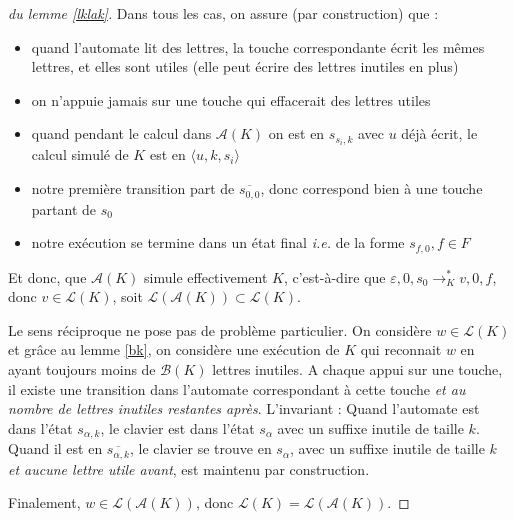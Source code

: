 \documentclass[12pt, a4paper]{article}
\renewcommand{\L}{\mathcal{L}}
\newcommand{\A}{\mathcal{A}}
\begin{document}
\begin{proof}[du lemme \ref{lklak}]
       Dans tous les cas, on assure (par construction) que :
       \begin{itemize}
        \item quand l'automate lit des lettres, la touche correspondante écrit les mêmes lettres, et elles sont utiles (elle peut écrire des lettres inutiles en plus)
        \item on n'appuie jamais sur une touche qui effacerait des lettres utiles 
        \item quand pendant le calcul dans $\A(K)$ on est en $s_{s_i,k}$ avec $u$ déjà écrit, le calcul simulé de $K$ est en $\langle u,k,s_i\rangle$
        \item notre première transition part de $\overline{s_{0,0}}$, donc correspond bien à une touche partant de $s_0$ 
        \item notre exécution se termine dans un état final \textit{i.e.} de la forme $s_{f,0}, f \in F$
       \end{itemize} 
       Et donc, que $\A(K)$ simule effectivement $K$, c'est-à-dire que $\varepsilon,0,s_0 \rightarrow^*_K v,0,f$, donc $v \in \L(K)$, soit $\L(\A(K)) \subset \L(K)$.

       Le sens réciproque ne pose pas de problème particulier. On considère $w \in \L(K)$ et grâce au lemme \ref{bk}, on considère une exécution de $K$ qui reconnait $w$ en ayant toujours moins de $\mathcal{B}(K)$ lettres inutiles.
       A chaque appui sur une touche, il existe une transition dans l'automate correspondant à cette touche \emph{et au nombre de lettres inutiles restantes après}. L'invariant : Quand l'automate est dans l'état $s_{\alpha,k}$, le clavier est dans l'état $s_\alpha$ avec un suffixe inutile de taille $k$. Quand il est en $\overline{s_{\alpha,k}}$, le clavier se trouve en $s_\alpha$, avec un suffixe inutile de taille $k$ \emph{et aucune lettre utile avant}, est maintenu par construction.
    
       Finalement, $w \in \L(\A(K))$, donc $\L(K) = \L(\A(K))$.
    \end{proof}
\end{document}
